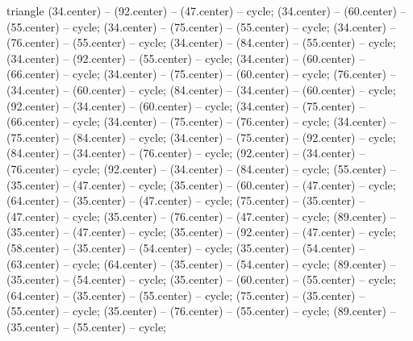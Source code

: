 \begin{pgfonlayer}{triangle}
 (34.center) -- (92.center) -- (47.center) -- cycle; 
 (34.center) -- (60.center) -- (55.center) -- cycle; 
 (34.center) -- (75.center) -- (55.center) -- cycle; 
 (34.center) -- (76.center) -- (55.center) -- cycle; 
 (34.center) -- (84.center) -- (55.center) -- cycle; 
 (34.center) -- (92.center) -- (55.center) -- cycle; 
 (34.center) -- (60.center) -- (66.center) -- cycle; 
 (34.center) -- (75.center) -- (60.center) -- cycle; 
 (76.center) -- (34.center) -- (60.center) -- cycle; 
 (84.center) -- (34.center) -- (60.center) -- cycle; 
 (92.center) -- (34.center) -- (60.center) -- cycle; 
 (34.center) -- (75.center) -- (66.center) -- cycle; 
 (34.center) -- (75.center) -- (76.center) -- cycle; 
 (34.center) -- (75.center) -- (84.center) -- cycle; 
 (34.center) -- (75.center) -- (92.center) -- cycle; 
 (84.center) -- (34.center) -- (76.center) -- cycle; 
 (92.center) -- (34.center) -- (76.center) -- cycle; 
 (92.center) -- (34.center) -- (84.center) -- cycle; 
 (55.center) -- (35.center) -- (47.center) -- cycle; 
 (35.center) -- (60.center) -- (47.center) -- cycle; 
 (64.center) -- (35.center) -- (47.center) -- cycle; 
 (75.center) -- (35.center) -- (47.center) -- cycle; 
 (35.center) -- (76.center) -- (47.center) -- cycle; 
 (89.center) -- (35.center) -- (47.center) -- cycle; 
 (35.center) -- (92.center) -- (47.center) -- cycle; 
 (58.center) -- (35.center) -- (54.center) -- cycle; 
 (35.center) -- (54.center) -- (63.center) -- cycle; 
 (64.center) -- (35.center) -- (54.center) -- cycle; 
 (89.center) -- (35.center) -- (54.center) -- cycle; 
 (35.center) -- (60.center) -- (55.center) -- cycle; 
 (64.center) -- (35.center) -- (55.center) -- cycle; 
 (75.center) -- (35.center) -- (55.center) -- cycle; 
 (35.center) -- (76.center) -- (55.center) -- cycle; 
 (89.center) -- (35.center) -- (55.center) -- cycle; 

\end{pgfonlayer}

